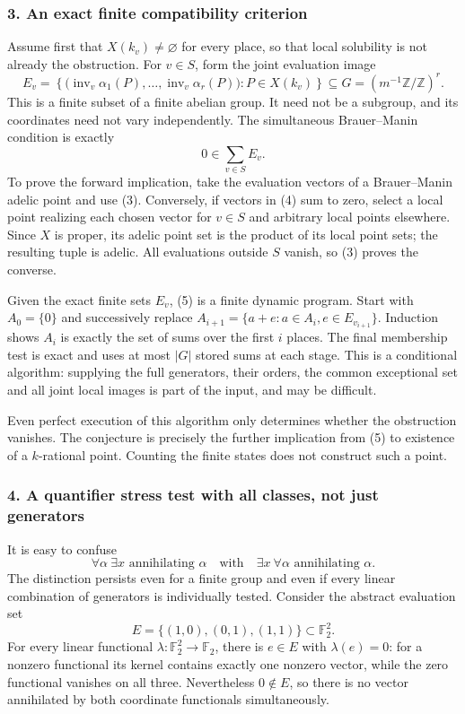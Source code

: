 \documentclass[11pt]{article}
\begin{document}
\subsubsection{3. An exact finite compatibility criterion}
Assume first that $X(k_v)\ne\varnothing$ for every place, so that local solubility is not already the obstruction. For $v\in S$, form the joint evaluation image
\[
 E_v=\left\{\bigl(\operatorname{inv}_v\alpha_1(P),\ldots,
                  \operatorname{inv}_v\alpha_r(P)\bigr):P\in X(k_v)\right\}
 \subseteq G=(m^{-1}\mathbb Z/\mathbb Z)^r.             \tag{4}
\]
This is a finite subset of a finite abelian group. It need not be a subgroup, and its coordinates need not vary independently. The simultaneous Brauer--Manin condition is exactly
\[
 0\in \sum_{v\in S}E_v.                               \tag{5}
\]
To prove the forward implication, take the evaluation vectors of a Brauer--Manin adelic point and use (3). Conversely, if vectors in (4) sum to zero, select a local point realizing each chosen vector for $v\in S$ and arbitrary local points elsewhere. Since $X$ is proper, its adelic point set is the product of its local point sets; the resulting tuple is adelic. All evaluations outside $S$ vanish, so (3) proves the converse.

Given the exact finite sets $E_v$, (5) is a finite dynamic program. Start with $A_0=\{0\}$ and successively replace
$A_{i+1}=\{a+e:a\in A_i,e\in E_{v_{i+1}}\}$. Induction shows $A_i$ is exactly the set of sums over the first $i$ places. The final membership test is exact and uses at most $|G|$ stored sums at each stage. This is a conditional algorithm: supplying the full generators, their orders, the common exceptional set and all joint local images is part of the input, and may be difficult.

Even perfect execution of this algorithm only determines whether the obstruction vanishes. The conjecture is precisely the further implication from (5) to existence of a $k$-rational point. Counting the finite states does not construct such a point.

\subsubsection{4. A quantifier stress test with all classes, not just generators}
It is easy to confuse
\[
 \forall\alpha\ \exists x\text{ annihilating }\alpha
 \quad\text{with}\quad
 \exists x\ \forall\alpha\text{ annihilating }\alpha.
\]
The distinction persists even for a finite group and even if every linear combination of generators is individually tested. Consider the abstract evaluation set
\[
 E=\{(1,0),(0,1),(1,1)\}\subset\mathbb F_2^2.
\]
For every linear functional $\lambda:\mathbb F_2^2\to\mathbb F_2$, there is $e\in E$ with $\lambda(e)=0$: for a nonzero functional its kernel contains exactly one nonzero vector, while the zero functional vanishes on all three. Nevertheless $0\notin E$, so there is no vector annihilated by both coordinate functionals simultaneously.
\end{document}
